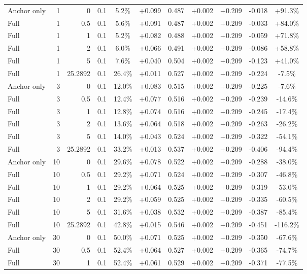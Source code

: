 \begin{table}[htbp]
\begin{tabular}{lrrrccccccc}
Anchor only & 1 & 0 & 0.1 & 5.2\% & +0.099 & 0.487 & +0.002 & +0.209 & -0.018 & +91.3\% \\
Full & 1 & 0.5 & 0.1 & 5.6\% & +0.091 & 0.487 & +0.002 & +0.209 & -0.033 & +84.0\% \\
Full & 1 & 1 & 0.1 & 5.2\% & +0.082 & 0.488 & +0.002 & +0.209 & -0.059 & +71.8\% \\
Full & 1 & 2 & 0.1 & 6.0\% & +0.066 & 0.491 & +0.002 & +0.209 & -0.086 & +58.8\% \\
Full & 1 & 5 & 0.1 & 7.6\% & +0.040 & 0.504 & +0.002 & +0.209 & -0.123 & +41.0\% \\
Full & 1 & 25.2892 & 0.1 & 26.4\% & +0.011 & 0.527 & +0.002 & +0.209 & -0.224 & -7.5\% \\
Anchor only & 3 & 0 & 0.1 & 12.0\% & +0.083 & 0.515 & +0.002 & +0.209 & -0.225 & -7.6\% \\
Full & 3 & 0.5 & 0.1 & 12.4\% & +0.077 & 0.516 & +0.002 & +0.209 & -0.239 & -14.6\% \\
Full & 3 & 1 & 0.1 & 12.8\% & +0.074 & 0.516 & +0.002 & +0.209 & -0.245 & -17.4\% \\
Full & 3 & 2 & 0.1 & 13.6\% & +0.064 & 0.518 & +0.002 & +0.209 & -0.263 & -26.2\% \\
Full & 3 & 5 & 0.1 & 14.0\% & +0.043 & 0.524 & +0.002 & +0.209 & -0.322 & -54.1\% \\
Full & 3 & 25.2892 & 0.1 & 33.2\% & +0.013 & 0.537 & +0.002 & +0.209 & -0.406 & -94.4\% \\
Anchor only & 10 & 0 & 0.1 & 29.6\% & +0.078 & 0.522 & +0.002 & +0.209 & -0.288 & -38.0\% \\
Full & 10 & 0.5 & 0.1 & 29.2\% & +0.071 & 0.524 & +0.002 & +0.209 & -0.307 & -46.8\% \\
Full & 10 & 1 & 0.1 & 29.2\% & +0.064 & 0.525 & +0.002 & +0.209 & -0.319 & -53.0\% \\
Full & 10 & 2 & 0.1 & 29.2\% & +0.059 & 0.525 & +0.002 & +0.209 & -0.335 & -60.5\% \\
Full & 10 & 5 & 0.1 & 31.6\% & +0.038 & 0.532 & +0.002 & +0.209 & -0.387 & -85.4\% \\
Full & 10 & 25.2892 & 0.1 & 42.8\% & +0.015 & 0.546 & +0.002 & +0.209 & -0.451 & -116.2\% \\
Anchor only & 30 & 0 & 0.1 & 50.0\% & +0.071 & 0.525 & +0.002 & +0.209 & -0.350 & -67.6\% \\
Full & 30 & 0.5 & 0.1 & 52.4\% & +0.064 & 0.527 & +0.002 & +0.209 & -0.365 & -74.7\% \\
Full & 30 & 1 & 0.1 & 52.4\% & +0.061 & 0.529 & +0.002 & +0.209 & -0.371 & -77.5\% \\

\end{tabular}
\end{table}
